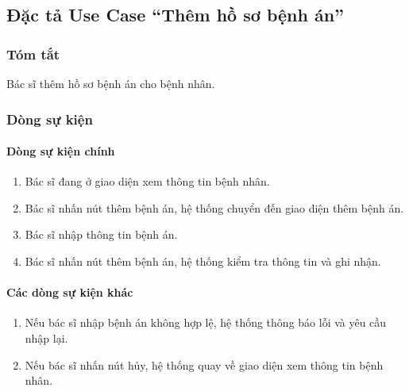 \subsection{Đặc tả Use Case ``Thêm hồ sơ bệnh án''}

\subsubsection{Tóm tắt}
Bác sĩ thêm hồ sơ bệnh án cho bệnh nhân.

\subsubsection{Dòng sự kiện}
\paragraph{\textbf{Dòng sự kiện chính}}
\begin{enumerate}
    \item Bác sĩ đang ở giao diện xem thông tin bệnh nhân.
    \item Bác sĩ nhấn nút thêm bệnh án, hệ thống chuyển đến giao diện thêm bệnh án.
    \item Bác sĩ nhập thông tin bệnh án.
    \item Bác sĩ nhấn nút thêm bệnh án, hệ thống kiểm tra thông tin và ghi nhận.
\end{enumerate}

\paragraph{\textbf{Các dòng sự kiện khác}}
\begin{enumerate}
    \item Nếu bác sĩ nhập bệnh án không hợp lệ, hệ thống thông báo lỗi và yêu cầu nhập lại.
    \item Nếu bác sĩ nhấn nút hủy, hệ thống quay về giao diện xem thông tin bệnh nhân.
\end{enumerate}

